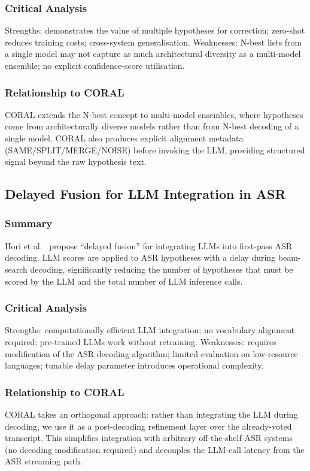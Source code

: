 \subsubsection{Critical Analysis}
Strengths: demonstrates the value of multiple hypotheses for correction; zero-shot reduces training costs; cross-system generalisation. Weaknesses: N-best lists from a single model may not capture as much architectural diversity as a multi-model ensemble; no explicit confidence-score utilisation.

\subsubsection{Relationship to CORAL}
CORAL extends the N-best concept to multi-model ensembles, where hypotheses come from architecturally diverse models rather than from N-best decoding of a single model. CORAL also produces explicit alignment metadata (SAME/SPLIT/MERGE/NOISE) before invoking the LLM, providing structured signal beyond the raw hypothesis text.

\subsection{Delayed Fusion for LLM Integration in ASR}
\label{ssec:lit-hori}

\subsubsection{Summary}
Hori et al.~\cite{hori2025delayed} propose ``delayed fusion'' for integrating LLMs into first-pass ASR decoding. LLM scores are applied to ASR hypotheses with a delay during beam-search decoding, significantly reducing the number of hypotheses that must be scored by the LLM and the total number of LLM inference calls.

\subsubsection{Critical Analysis}
Strengths: computationally efficient LLM integration; no vocabulary alignment required; pre-trained LLMs work without retraining. Weaknesses: requires modification of the ASR decoding algorithm; limited evaluation on low-resource languages; tunable delay parameter introduces operational complexity.

\subsubsection{Relationship to CORAL}
CORAL takes an orthogonal approach: rather than integrating the LLM during decoding, we use it as a post-decoding refinement layer over the already-voted transcript. This simplifies integration with arbitrary off-the-shelf ASR systems (no decoding modification required) and decouples the LLM-call latency from the ASR streaming path.

